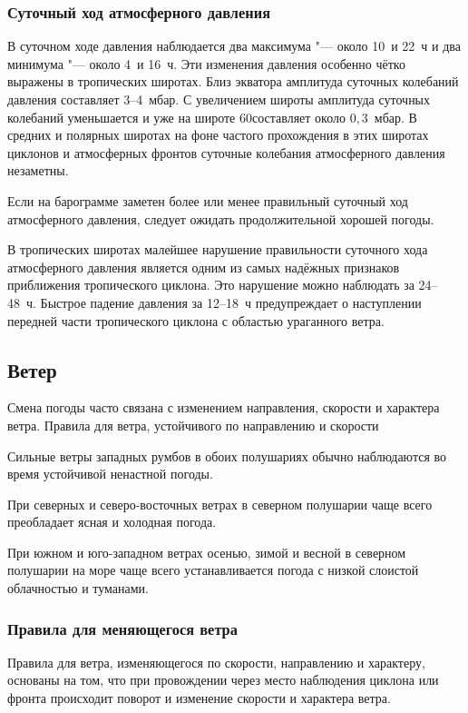 \subsubsection{Суточный ход атмосферного давления}

В суточном ходе давления наблюдается два максимума "--- около 10~и 22~ч и
два минимума "--- около 4~и 16~ч. Эти изменения давления особенно чётко
выражены в тропических широтах. Близ экватора амплитуда суточных
колебаний давления составляет 3--4~мбар. С увеличением широты амплитуда
суточных колебаний уменьшается и уже на широте 60\gr составляет около
$0,3$~мбар. В средних и полярных широтах на фоне частого прохождения в
этих широтах циклонов и атмосферных фронтов суточные колебания
атмосферного давления незаметны.

 Если на барограмме заметен более или менее правильный суточный
ход атмосферного давления, следует ожидать продолжительной хорошей
погоды.

 В тропических широтах малейшее нарушение правильности
суточного хода атмосферного давления является одним из самых надёжных
признаков приближения тропического циклона. Это нарушение можно
наблюдать за 24--48~ч. Быстрое падение давления за 12--18~ч
предупреждает о наступлении передней части тропического циклона с
областью ураганного ветра.

\subsection{Ветер}

Смена погоды часто связана с изменением направления, скорости и
характера ветра.  Правила для ветра, устойчивого по направлению и
скорости

 Сильные ветры западных румбов в обоих полушариях обычно
наблюдаются во время устойчивой ненастной погоды.

 При северных и северо-восточных ветрах в северном полушарии
чаще всего преобладает ясная и холодная погода.

 При южном и юго-западном ветрах осенью, зимой и весной в северном
полушарии на море чаще всего устанавливается погода с низкой слоистой
облачностью и туманами.

\subsubsection{Правила для меняющегося ветра}

Правила для ветра, изменяющегося по скорости, направлению и характеру,
основаны на том, что при провождении через место наблюдения циклона
или фронта происходит поворот и изменение скорости и характера ветра.

